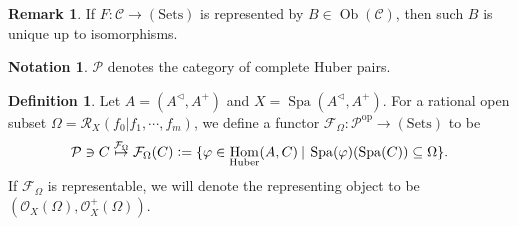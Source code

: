 \documentclass[10pt]{article}
\numberwithin{equation}{section}
\theoremstyle{definition}
\newtheorem{definition}{Definition}[subsection]
\newtheorem{notation}{Notation}[subsection]
\newtheorem{remark}{Remark}[subsection]
\DeclareMathOperator{\Hom}{Hom}
\DeclareMathOperator{\Ob}{Ob}
\DeclareMathOperator{\Spa}{Spa}
\newcommand{\defeq}{\vcentcolon=}
\newcommand{\cR}[0]{\mathcal{R}}
\newcommand{\sep}[0]{\:|\:}
\newcommand{\sC}[0]{\mathscr{C}}
\newcommand{\cO}[0]{\mathcal{O}}
\newcommand{\cF}[0]{\mathcal{F}}
\begin{document}
\begin{remark}
    If $F:\sC\to (\mathrm{Sets})$ is represented by $B\in\Ob(\sC)$, then such $B$ is unique up to isomorphisms.
\end{remark}

\begin{notation}
    $\mathcal{P}$ denotes the category of complete Huber pairs.
\end{notation}
\begin{definition}
    Let $A=(A^\triangleleft,A^+)$ and $X=\Spa(A^\triangleleft,A^+)$. For a rational open subset $\Omega = \cR_X(f_0|f_1,\cdots,f_m)$, we define a functor $\cF_\Omega:\mathcal{P}^{\mathrm{op}}\to(\mathrm{Sets})$ to be
    \begin{equation*}
        \mathcal{P}\ni C\stackrel{\cF_\Omega}{\mapsto}\cF_\Omega(C) \defeq\{\varphi\in\Hom_{\mathrm{Huber}}(A,C)\sep \Spa(\varphi)(\Spa(C))\subseteq\Omega\}.
    \end{equation*}
    If $\cF_\Omega$ is representable, we will denote the representing object to be $(\cO_X(\Omega),\cO_X^+(\Omega))$.
\end{definition}
\end{document}
